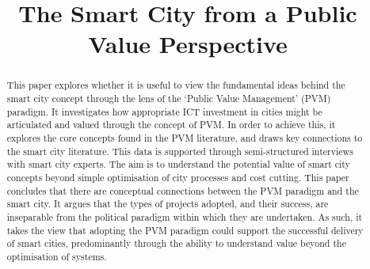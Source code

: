 \documentclass[conference]{IEEEtran}
\begin{document}
%
\title{The Smart City from a Public Value Perspective}


\author{
\and
{}
\and
{}
}





\maketitle


\begin{abstract}
This paper explores whether it is useful to view the fundamental ideas
behind the smart city concept through the lens of the `Public Value
Management' (PVM) paradigm. It investigates how appropriate ICT
investment in cities might be articulated and valued through the
concept of PVM. In order to achieve this, it explores the core
concepts found in the PVM literature, and draws key connections to the
smart city literature. This data is supported through semi-structured
interviews with smart city experts. The aim is to understand the
potential value of smart city concepts beyond simple optimisation of
city processes and cost cutting. This paper concludes that there are
conceptual connections between the PVM paradigm and the smart city. It
argues that the types of projects adopted, and their success, are
inseparable from the political paradigm within which they are
undertaken. As such, it takes the view that adopting the PVM paradigm
could support the successful delivery of smart cities, predominantly
through the ability to understand value beyond the optimisation of
systems.
\newline\newline
{}
\end{abstract}
\end{document}
